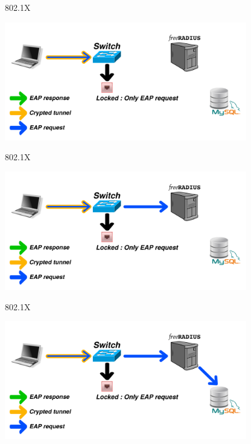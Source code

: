 \documentclass[12pt]{beamer}
\begin{document}
\begin{frame}[noframenumbering]{802.1X}
\vfill
\begin{center}
    \includegraphics[width=300pt]{img/dot1x_2.pdf}
    \addtocounter{framenumber}{-1}
\end{center}
\vfill
\end{frame}

\begin{frame}[noframenumbering]{802.1X}
\vfill
\begin{center}
    \includegraphics[width=300pt]{img/dot1x_3.pdf}
    \addtocounter{framenumber}{-1}
\end{center}
\vfill
\end{frame}

\begin{frame}[noframenumbering]{802.1X}
\vfill
\begin{center}
    \includegraphics[width=300pt]{img/dot1x_4.pdf}
    \addtocounter{framenumber}{-1}
\end{center}
\vfill
\end{frame}
\end{document}
